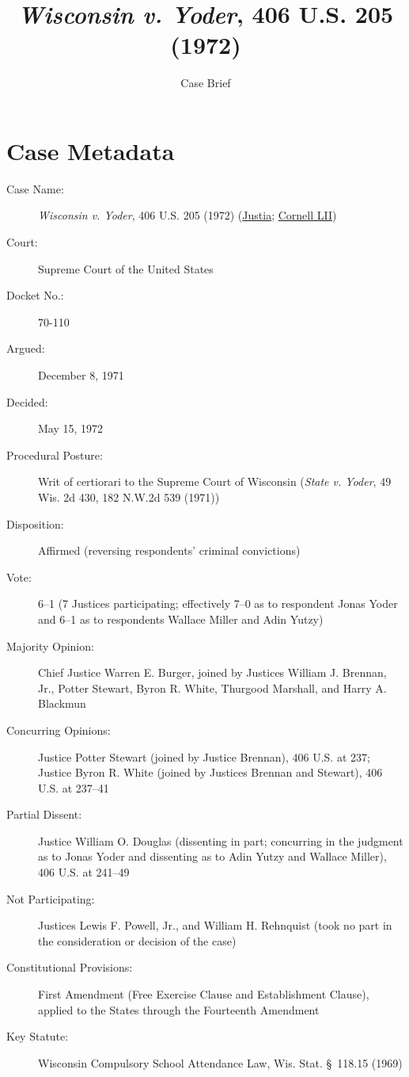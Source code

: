 \documentclass[12pt]{article}
\title{\textit{Wisconsin v. Yoder}, 406 U.S. 205 (1972)}
\author{Case Brief}
\date{}
\begin{document}
\maketitle


\section{Case Metadata}

\begin{description}
  \item[Case Name:] \emph{Wisconsin v. Yoder}, 406 U.S. 205 (1972) (\href{https://supreme.justia.com/cases/federal/us/406/205/}{Justia}; \href{https://www.law.cornell.edu/supremecourt/text/406/205}{Cornell LII})
  \item[Court:] Supreme Court of the United States
  \item[Docket No.:] 70-110
  \item[Argued:] December 8, 1971
  \item[Decided:] May 15, 1972
  \item[Procedural Posture:] Writ of certiorari to the Supreme Court of Wisconsin (\emph{State v. Yoder}, 49 Wis. 2d 430, 182 N.W.2d 539 (1971))
  \item[Disposition:] Affirmed (reversing respondents' criminal convictions)
  \item[Vote:] 6--1 (7 Justices participating; effectively 7--0 as to respondent Jonas Yoder and 6--1 as to respondents Wallace Miller and Adin Yutzy)
  \item[Majority Opinion:] Chief Justice Warren E. Burger, joined by Justices William J. Brennan, Jr., Potter Stewart, Byron R. White, Thurgood Marshall, and Harry A. Blackmun
  \item[Concurring Opinions:] Justice Potter Stewart (joined by Justice Brennan), 406 U.S. at 237; Justice Byron R. White (joined by Justices Brennan and Stewart), 406 U.S. at 237--41
  \item[Partial Dissent:] Justice William O. Douglas (dissenting in part; concurring in the judgment as to Jonas Yoder and dissenting as to Adin Yutzy and Wallace Miller), 406 U.S. at 241--49
  \item[Not Participating:] Justices Lewis F. Powell, Jr., and William H. Rehnquist (took no part in the consideration or decision of the case)
  \item[Constitutional Provisions:] First Amendment (Free Exercise Clause and Establishment Clause), applied to the States through the Fourteenth Amendment
  \item[Key Statute:] Wisconsin Compulsory School Attendance Law, Wis. Stat. \S~118.15 (1969)
\end{description}
\end{document}

